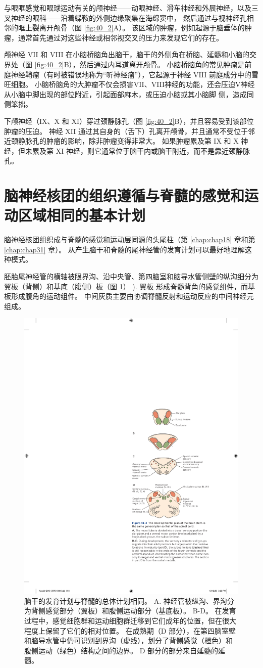 与眼眶感觉和眼球运动有关的颅神经——动眼神经、滑车神经和外展神经，以及三叉神经的眼科——沿着蝶鞍的外侧边缘聚集在海绵窦中， 然后通过与视神经孔相邻的眶上裂离开颅骨（图 \ref{fig:40_2}A）。 该区域的肿瘤，例如起源于脑垂体的肿瘤，通常首先通过对这些神经或相邻视交叉的压力来发现它们的存在。

颅神经 VII 和 VIII 在小脑桥脑角出脑干，脑干的外侧角在桥脑、延髓和小脑的交界处（图 \ref{fig:40_2}B），然后通过内耳道离开颅骨。 小脑桥脑角的常见肿瘤是前庭神经鞘瘤（有时被错误地称为“听神经瘤”），它起源于神经 VIII 前庭成分中的雪旺细胞。 小脑桥脑角的大肿瘤不仅会损害VII、VIII神经的功能，还会压迫V神经从小脑中脚出现的部位附近，引起面部麻木，或压迫小脑或其小脑脚 侧，造成同侧笨拙。

下颅神经（IX、X 和 XI）穿过颈静脉孔（图 \ref{fig:40_2}B），并且容易受到该部位肿瘤的压迫。 神经 XII 通过其自身的（舌下）孔离开颅骨，并且通常不受位于邻近颈静脉孔的肿瘤的影响，除非肿瘤变得非常大。 如果肿瘤累及第 IX 和 X 神经，但未累及第 XI 神经，则它通常位于脑干内或脑干附近，而不是靠近颈静脉孔。


\section{脑神经核团的组织遵循与脊髓的感觉和运动区域相同的基本计划}
脑神经核团组织成与脊髓的感觉和运动层同源的头尾柱（第 \ref{chap:chap18} 章和第 \ref{chap:chap31} 章）。 从产生脑干和脊髓的尾神经管的发育计划可以最好地理解这种模式。

胚胎尾神经管的横轴被限界沟、沿中央管、第四脑室和脑导水管侧壁的纵沟细分为翼板（背侧）和基底（腹侧）板（图 \ref{fig:40_4}） ). 翼板
形成脊髓背角的感觉组件，而基板形成腹角的运动组件。 中间灰质主要由协调脊髓反射和运动反应的中间神经元组成。

\begin{figure}[htbp]
	\centering
	\includegraphics[width=0.5\linewidth]{chap40/fig_40_4}
	\caption{脑干的发育计划与脊髓的总体计划相同。 A. 神经管被纵沟、界沟分为背侧感觉部分（翼板）和腹侧运动部分（基底板）。 B-D。 在发育过程中，感觉细胞群和运动细胞群迁移到它们成年的位置，但在很大程度上保留了它们的相对位置。 在成熟期（D 部分），在第四脑室壁和脑导水管中仍可识别到界沟（虚线），划分了背侧感觉（橙色）和腹侧运动（绿色）结构之间的边界。 D 部分的部分来自延髓的延髓。}
	\label{fig:40_4}
\end{figure}

